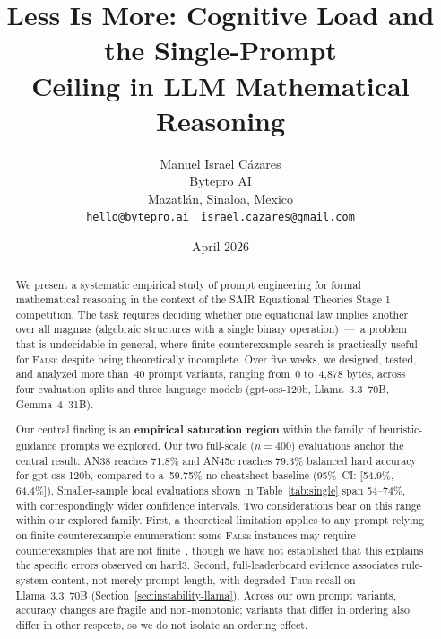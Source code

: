 \documentclass[11pt]{article}
\title{\textbf{Less Is More: Cognitive Load and the Single-Prompt\\
Ceiling in LLM Mathematical Reasoning}}
\author{
  Manuel Israel C\'{a}zares \\
  Bytepro AI \\
  Mazatl\'{a}n, Sinaloa, Mexico \\
  \texttt{hello@bytepro.ai} $|$ \texttt{israel.cazares@gmail.com}
}
\date{April 2026}
\begin{document}
\maketitle

\begin{abstract}
We present a systematic empirical study of prompt engineering for
formal mathematical reasoning in the context of the SAIR Equational
Theories Stage 1 competition. The task requires deciding whether one
equational law implies another over all magmas (algebraic structures
with a single binary operation)~---~a problem that is undecidable in
general, where finite counterexample search is practically useful
for \textsc{False} despite being theoretically incomplete. Over
five weeks, we designed, tested, and analyzed more than~40 prompt
variants, ranging from~0 to~4{,}878 bytes, across four evaluation
splits and three language models (gpt-oss-120b, Llama~3.3~70B,
Gemma~4~31B).

Our central finding is an \textbf{empirical saturation region} within
the family of heuristic-guidance prompts we explored. Our two full-scale
($n=400$) evaluations anchor the central result: AN38 reaches 71.8\%
and AN45c reaches 79.3\% balanced hard accuracy for gpt-oss-120b,
compared to a~59.75\% no-cheatsheet baseline (95\%~CI: [54.9\%,
64.4\%]). Smaller-sample local evaluations shown in
Table~\ref{tab:single} span 54--74\%, with correspondingly
wider confidence intervals. Two considerations bear on this range
within our explored family. First, a theoretical limitation applies
to any prompt relying on finite counterexample enumeration: some
\textsc{False} instances may require counterexamples that are not
finite~\citep{tao2025etp}, though we have not established that this
explains the specific errors observed on hard3. Second, full-leaderboard
evidence associates rule-system content, not merely prompt length, with
degraded \textsc{True} recall on Llama~3.3~70B
(Section~\ref{sec:instability-llama}). Across our own prompt variants,
accuracy changes are fragile and non-monotonic; variants that differ in
ordering also differ in other respects, so we do not isolate an ordering
effect.


\end{abstract}
\end{document}
